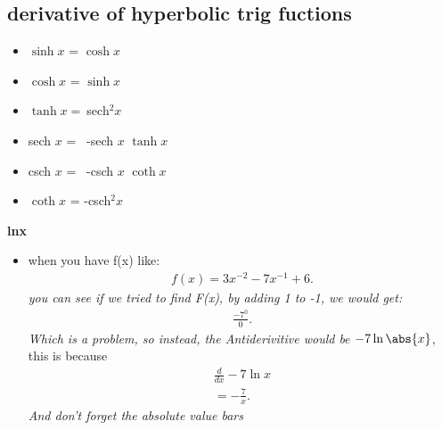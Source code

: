 \documentclass{report}
\begin{document}
    \bigbreak \noindent \bigbreak \noindent 
    \subsection{derivative of hyperbolic trig fuctions}
    \begin{itemize}
      \item $\sinh{x}$ = $\cosh{x} $
      \item $\cosh{x}$ = $\sinh{x} $
      \item $\tanh{x} = \  $sech$^{2}$$x $
      \item sech $x $ = \ -sech $x$ $\tanh{x} $
      \item csch $x$ = \ -csch $x$ $\coth{x}$
      \item $\coth{x}$ = -csch$^{2}x$
    \end{itemize}
    \bigbreak \noindent 
    \textbf{lnx}
    \begin{itemize}
      \item when you have f(x) like:
        \begin{align*}
          f(x) = 3x^{-2}-7x^{-1}+6
        .\end{align*}
        \bigbreak \noindent 
        \textit{you can see if we tried to find F(x), by adding 1 to -1, we would get:}
        \begin{align*}
          \frac{-7^{0}}{0}
        .\end{align*}
        \bigbreak \noindent 
        \textit{Which is a problem, so instead, the Antiderivitive would be $-7\ln{\abs{x}}$}, this is because
        \begin{align*}
          \frac{d}{dx} -7\ln{x}\\ = -\frac{7}{x}
        .\end{align*}
        \bigbreak \noindent 
        \textit{And don't forget the absolute value bars}
    \end{itemize}

    \bigbreak \noindent \bigbreak \noindent
\end{document}
